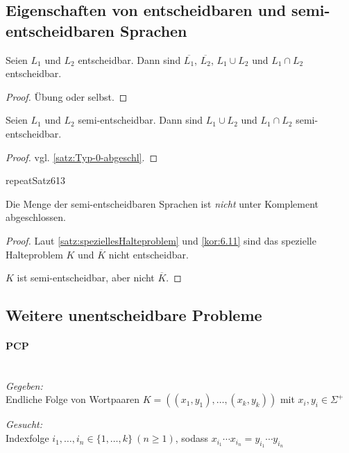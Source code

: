 {\subsection{Eigenschaften von entscheidbaren und semi-entscheidbaren Sprachen}
\begin{Satz}[name={[Eigenschaften von Entscheidbarkeit]}]
\label{thm:eigensch-von-entsch}
  Seien $L_1$ und $L_2$ entscheidbar. Dann sind $\overline{L_1}$, $\overline{L_2}$, $L_1 \cup L_2$ und $L_1 \cap L_2$ entscheidbar.
\end{Satz}\vspace{-1.5em}
\begin{proof}
  Übung oder selbst.
\end{proof}
\begin{Satz}[name={[Eigenschaften von Semi-Entscheidbarkeit]}]
  Seien $L_1$ und $L_2$ semi-entscheidbar. Dann sind $L_1 \cup L_2$ und $L_1 \cap L_2$ semi-entscheidbar.
\end{Satz}
\begin{proof}
  vgl. \autoref{satz:Typ-0-abgeschl}.
\end{proof}
\csname repeatSatz613\endcsname*
\begin{Satz}
  Die Menge der semi-entscheidbaren Sprachen ist \emph{nicht}
  unter Komplement abgeschlossen.
\end{Satz}
\begin{proof}
  Laut \autoref{satz:speziellesHalteproblem} und \autoref{kor:6.11} sind das spezielle Halteproblem $K$ und $\overline{K}$ nicht entscheidbar.
  
  $K$ ist semi-entscheidbar, aber nicht $\overline{K}$.
\end{proof}


\subsection{Weitere unentscheidbare Probleme}
\paragraph[\acf*{PCP}]{\acf{PCP}}\ \\
\emph{Gegeben:}\\
Endliche Folge von Wortpaaren $K=((x_1, y_1), \dots, (x_k, y_k))$ mit $x_i, y_i \in \Sigma^+$

\emph{Gesucht:}\\
Indexfolge $i_1, \dots, i_n \in \{1, \dots, k\}\ (n \geq 1)$, sodass $x_{i_1} \cdots x_{i_n}=y_{i_1} \cdots y_{i_n}$

}
